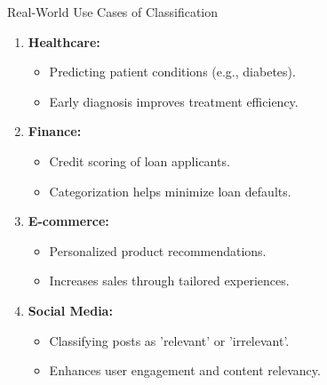 \documentclass[aspectratio=169]{beamer}
\begin{document}
\begin{frame}[fragile]{Real-World Use Cases of Classification}
  \begin{enumerate}
    \item \textbf{Healthcare:}
    \begin{itemize}
      \item Predicting patient conditions (e.g., diabetes).
      \item Early diagnosis improves treatment efficiency.
    \end{itemize}
    
    \item \textbf{Finance:}
    \begin{itemize}
      \item Credit scoring of loan applicants.
      \item Categorization helps minimize loan defaults.
    \end{itemize}
    
    \item \textbf{E-commerce:}
    \begin{itemize}
      \item Personalized product recommendations.
      \item Increases sales through tailored experiences.
    \end{itemize}
    
    \item \textbf{Social Media:}
    \begin{itemize}
      \item Classifying posts as 'relevant' or 'irrelevant'.
      \item Enhances user engagement and content relevancy.
    \end{itemize}
  \end{enumerate}
\end{frame}
\end{document}
